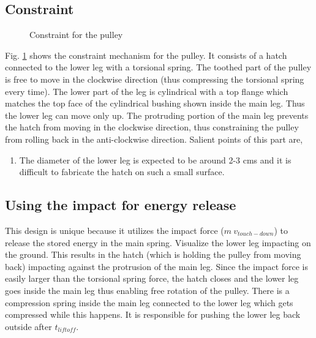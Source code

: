 \subsection{Constraint}
\begin{figure}[!h]
\centering
\caption{Constraint for the pulley}
\label{fig:3_pratik_constraint}
\end{figure}
Fig. \ref{fig:3_pratik_constraint} shows the constraint mechanism for the pulley. It consists of a hatch connected to
the lower leg with a torsional spring. The toothed part of the pulley is free to move in the clockwise direction (thus
compressing the torsional spring every time). The lower part of the leg is cylindrical with a top flange which matches
the top face of the cylindrical bushing shown inside the main leg. Thus the lower leg can move only up. The protruding
portion of the main leg prevents the hatch from moving in the clockwise direction, thus constraining the pulley from
rolling back in the anti-clockwise direction.
Salient points of this part are,
\begin{enumerate}
\item
The diameter of the lower leg is expected to be around 2-3 cms and it is difficult to fabricate the hatch on such
a small surface.
\end{enumerate}

\subsection{Using the impact for energy release}
This design is unique because it utilizes the impact force ($m\:v_{touch-down}$) to release the stored energy in the main
spring. Visualize the lower leg impacting on the ground. This results in the hatch (which is holding the pulley from
moving back) impacting against the protrusion of the main leg. Since the impact force is easily larger than the torsional
spring force, the hatch closes and the lower leg goes inside the main leg thus enabling free rotation of the pulley. There
is a compression spring inside the main leg connected to the lower leg which gets compressed while this happens. It is
responsible for pushing the lower leg back outside after $t_{liftoff}$.

